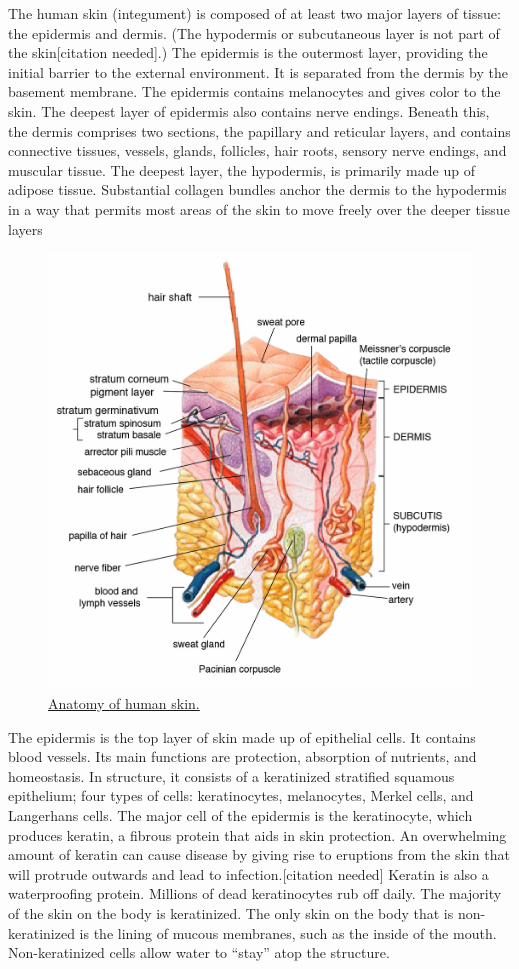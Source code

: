 The human skin (integument) is composed of at least two major layers of tissue: the epidermis and dermis. (The hypodermis or subcutaneous layer is not part of the skin{[}citation needed{]}.) The epidermis is the outermost layer, providing the initial barrier to the external environment. It is separated from the dermis by the basement membrane. The epidermis contains melanocytes and gives color to the skin. The deepest layer of epidermis also contains nerve endings. Beneath this, the dermis comprises two sections, the papillary and reticular layers, and contains connective tissues, vessels, glands, follicles, hair roots, sensory nerve endings, and muscular tissue. The deepest layer, the hypodermis, is primarily made up of adipose tissue. Substantial collagen bundles anchor the dermis to the hypodermis in a way that permits most areas of the skin to move freely over the deeper tissue layers



\begin{figure}

{\centering \includegraphics[width=0.7\linewidth]{./figures/animals/Skin} 

}

\caption{\href{https://commons.wikimedia.org/wiki/File:Skin.jpg}{Anatomy of human skin.}}\label{fig:skin}
\end{figure}

The epidermis is the top layer of skin made up of epithelial cells. It contains blood vessels. Its main functions are protection, absorption of nutrients, and homeostasis. In structure, it consists of a keratinized stratified squamous epithelium; four types of cells: keratinocytes, melanocytes, Merkel cells, and Langerhans cells. The major cell of the epidermis is the keratinocyte, which produces keratin, a fibrous protein that aids in skin protection. An overwhelming amount of keratin can cause disease by giving rise to eruptions from the skin that will protrude outwards and lead to infection.{[}citation needed{]} Keratin is also a waterproofing protein. Millions of dead keratinocytes rub off daily. The majority of the skin on the body is keratinized. The only skin on the body that is non-keratinized is the lining of mucous membranes, such as the inside of the mouth. Non-keratinized cells allow water to ``stay'' atop the structure.

